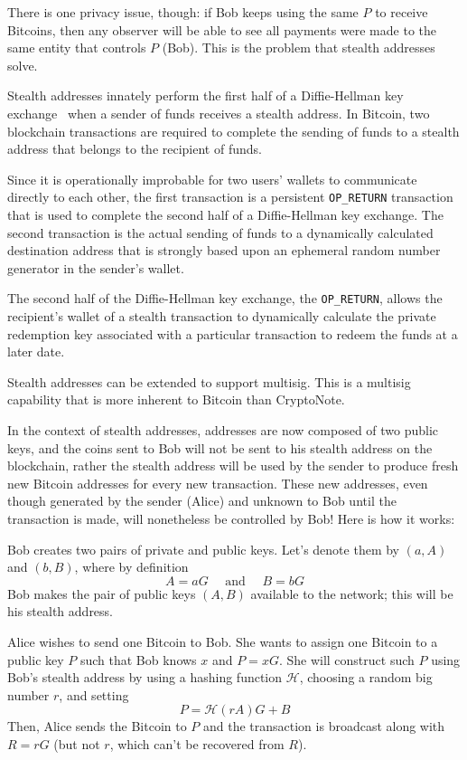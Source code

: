 There is one privacy issue, though: if Bob keeps using the same $P$ to receive Bitcoins, then any observer will be able to see all payments were made to the same entity that controls $P$ (Bob). This is the problem that stealth addresses solve.

Stealth addresses innately perform the first half of a Diffie-Hellman key exchange~\cite{Diffie:2006:NDC:2263321.2269104} when a sender of funds receives a stealth address. In Bitcoin, two blockchain transactions are required to complete the sending of funds to a stealth address that belongs to the recipient of funds.

Since it is operationally improbable for two users' wallets to communicate directly to each other, the first transaction is a persistent \verb|OP_RETURN| transaction that is used to complete the second half of a Diffie-Hellman key exchange. The second transaction is the actual sending of funds to a dynamically calculated destination address that is strongly based upon an ephemeral random number generator in the sender's wallet.

The second half of the Diffie-Hellman key exchange, the \verb|OP_RETURN|, allows the recipient's wallet of a stealth transaction to dynamically calculate the private redemption key associated with a particular transaction to redeem the funds at a later date.

Stealth addresses can be extended to support multisig. This is a multisig capability that is more inherent to Bitcoin than CryptoNote.

In the context of stealth addresses, addresses are now composed of two public keys, and the coins sent to Bob will not be sent to his stealth address on the blockchain, rather the stealth address will be used by the sender to produce fresh new Bitcoin addresses for every new transaction. These new addresses, even though generated by the sender (Alice) and unknown to Bob until the transaction is made, will nonetheless be controlled by Bob! Here is how it works:

Bob creates two pairs of private and public keys. Let's denote them by $(a,A)$ and $(b,B)$, where by definition
\begin{equation}
  A = aG \quad \mbox{ and } \quad B = bG
\end{equation}
Bob makes the pair of public keys $(A,B)$ available to the network; this will be his stealth address.

Alice wishes to send one Bitcoin to Bob. She wants to assign one Bitcoin to a public key $P$ such that Bob knows $x$ and $P = xG$. She will construct such $P$ using Bob's stealth address by using a hashing function $\mathcal{H}$, choosing a random big number $r$, and setting
\begin{equation}
  P = \mathcal{H}(rA)G + B
\end{equation}
Then, Alice sends the Bitcoin to $P$ and the transaction is broadcast along with $R = rG$ (but not $r$, which can't be recovered from $R$).

